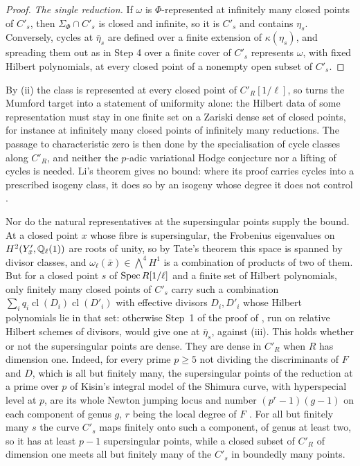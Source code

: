 \begin{proof}
\emph{The single reduction.} If $\omega$ is $\Phi$-represented at infinitely
many closed points of $C'_{s}$, then $\Sigma_{\Phi}\cap C'_{s}$ is closed and
infinite, so it is $C'_{s}$ and contains $\eta_{s}$. Conversely, cycles at
$\bar\eta_{s}$ are defined over a finite extension of $\kappa(\eta_{s})$, and
spreading them out as in Step 4 over a finite cover of $C'_{s}$ represents
$\omega$, with fixed Hilbert polynomials, at every closed point of a nonempty
open subset of $C'_{s}$.
\end{proof}

\begin{remark}\label{rem:modpremains}
By (ii) the class is represented at every closed point of
$C'_{R}[1/\ell]$, so  turns the Mumford target into a
statement of uniformity alone: the Hilbert data of some representation must
stay in one finite set on a Zariski dense set of closed points, for instance
at infinitely many closed points of infinitely many reductions. The passage
to characteristic zero is then done by the specialisation of cycle classes
along $C'_{R}$, and neither the $p$-adic variational Hodge conjecture nor a
lifting of cycles is needed. Li's theorem gives no bound: where its proof
carries cycles into a prescribed isogeny class, it does so by an isogeny whose
degree it does not control \cite[proof of Theorem~1.2, Step~3]{Li26}.

Nor do the natural representatives at the supersingular points supply the
bound. At a closed point $x$ whose fibre is supersingular, the Frobenius
eigenvalues on $H^{2}(Y'_{\bar{x}},\mathbb{Q}_{\ell}(1))$ are roots of unity, so by
Tate's theorem \cite{Tat66} this space is spanned by divisor classes, and
$\omega_{\ell}(\bar{x})\in{\textstyle\bigwedge^{4}}H^{1}$ is a combination of
products of two of them. But for a closed point $s$ of $\operatorname{Spec} R[1/\ell]$ and
a finite set of Hilbert polynomials, only finitely many closed points of
$C'_{s}$ carry such a combination $\sum_{i}q_{i}\operatorname{cl}(D_{i})
\operatorname{cl}(D'_{i})$ with effective divisors $D_{i},D'_{i}$ whose
Hilbert polynomials lie in that set: otherwise Step~1 of the proof of
, run on relative Hilbert schemes of divisors, would
give one at $\bar\eta_{s}$, against (iii). This holds whether
or not the supersingular points are dense. They are dense in $C'_{R}$ when $R$
has dimension one. Indeed, for every prime $p\ge5$ not dividing the
discriminants of $F$ and $D$, which is all but finitely many, the
supersingular points of the reduction at a prime over $p$ of Kisin's integral
model of the Shimura curve, with hyperspecial level at $p$, are its whole
Newton jumping locus and number $(p^{r}-1)(g-1)$ on each component of genus
$g$, $r$ being the local degree of $F$ \cite[Theorem~1.2 and
Corollary~5.17]{SZ11}. For all but finitely many $s$ the curve $C'_{s}$ maps
finitely onto such a component, of genus at least two, so it has at least
$p-1$ supersingular points, while a closed subset of $C'_{R}$ of dimension one
meets all but finitely many of the $C'_{s}$ in boundedly many points.


\end{remark}
